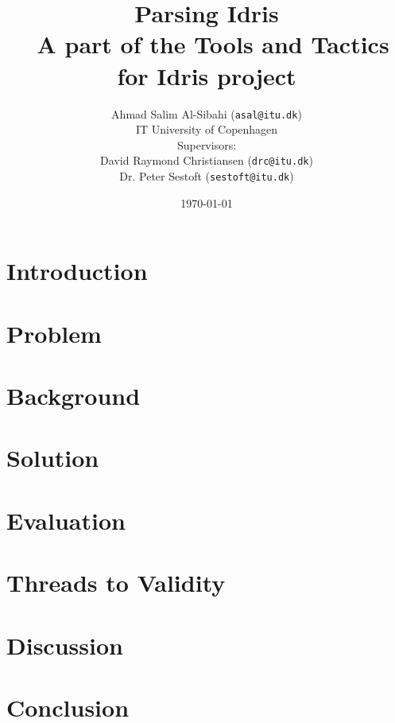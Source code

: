 \documentclass[a4paper]{article}%
\begin{document}
\let\origthebibliography\thebibliography
\let\origendthebibliography\endthebibliography
\newif\ifemptybibliography
\renewenvironment{thebibliography}[1]
 {\if\relax\detokenize{#1}\relax\emptybibliographytrue\else\origthebibliography{#1}\fi}
 {\ifemptybibliography\else\origendthebibliography\fi}


\title{Parsing Idris \\ \normalsize{A part of the Tools and Tactics for Idris project}}
\author{Ahmad Salim Al-Sibahi (\texttt{asal@itu.dk}) \\IT University of Copenhagen\\Supervisors: \\David Raymond Christiansen (\texttt{drc@itu.dk})\\ Dr. Peter Sestoft (\texttt{sestoft@itu.dk})}
\date{\today}


\maketitle



\section{Introduction}
\label{sec:Introduction}
\section{Problem}
\label{sec:Problem}
\section{Background}
\label{sec:Background}
\section{Solution}
\label{sec:Solution}
\section{Evaluation}
\label{sec:Evaluation}
\section{Threads to Validity}
\label{sec:ThreadsToValidity}
\section{Discussion}
\label{sec:Discussion}
\section{Conclusion}
\label{sec:Conclusion}




\let\Section\section  %
\def\section*#1{\Section{#1}}



\appendix
\end{document}
